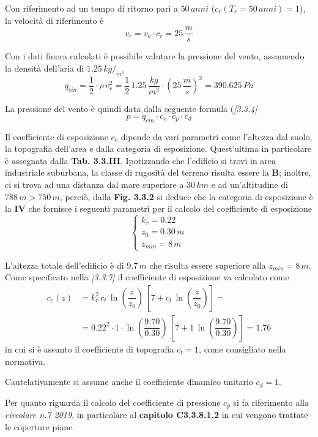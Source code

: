 Con riferimento ad un tempo di ritorno pari a $50\,anni$ ($c_r(T_r=50\,anni) = 1$), la velocità di riferimento è
\[
 v_r = v_b\cdot c_r = 25\,\dfrac{m}{s}
\]

Con i dati finora calcolati è possibile valutare la pressione del vento, assumendo la densità dell'aria di $1.25\,kg/_{m^3}$
\[
 q_{cin} = \dfrac{1}{2}\cdot\rho\, v_r^2 = \dfrac{1}{2}\,1.25\,\dfrac{kg}{m^3}\cdot\left(25\,\dfrac{m}{s}\right)^2 = 390.625\,Pa
\]

La pressione del vento è quindi data dalla seguente formula (\emph{[3.3.4]}
\[
 p = q_{cin}\cdot c_e\cdot c_p\cdot c_d
\]

Il coefficiente di esposizione $c_e$ dipende da vari parametri come l'altezza dal suolo, la topografia dell'area e dalla categoria di esposizione. Quest'ultima in particolare è assegnata dalla \textbf{Tab. 3.3.III}. Ipotizzando che l'edificio si trovi in area industriale suburbana, la classe di rugosità del terreno risulta essere la \textbf{B}; inoltre, ci si trova ad una distanza dal mare superiore a $30\,km$ e ad un'altitudine di $788\,m > 750\,m$, perciò, dalla \textbf{Fig. 3.3.2} si deduce che la categoria di esposizione è la \textbf{IV} che fornisce i seguenti parametri per il calcolo del coefficiente di esposizione
\begin{equation*}
 \begin{cases}
    k_r = 0.22\\
    z_0 = 0.30\,m\\
    z_{min} = 8\,m
 \end{cases}
\end{equation*}

L'altezza totale dell'edificio è di $9.7\,m$ che risulta essere superiore alla $z_{min} = 8\,m$. Come specificato nella \emph{[3.3.7]} il coefficiente di esposizione va calcolato come
\begin{align*}
 c_e(z) &= k_r^2 \, c_t\,\ln\left(\dfrac{z}{z_0}\right)\,\left[ 7 + c_t\,\ln\left(\dfrac{z}{z_0}\right)\right] = \\
 &= 0.22^2 \cdot 1\cdot \ln\left(\dfrac{9.70}{0.30}\right)\,\left[ 7 + 1\,\ln\left(\dfrac{9.70}{0.30}\right)\right] = 1.76
\end{align*}
in cui si è assunto il coefficiente di topografia $c_t = 1$, come consigliato nella normativa.

Cautelativamente si assume anche il coefficiente dinamico unitario $c_d = 1$.

Per quanto riguarda il calcolo del coefficiente di pressione $c_p$ si fa riferimento alla \emph{circolare n.7 2019}, in particolare al \textbf{capitolo C3.3.8.1.2} in cui vengono trattate le coperture piane.

